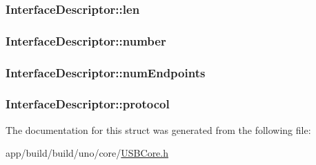 \hypertarget{struct_interface_descriptor_a4a2810138576ef2662bb21dba8e9bbb8}{
\subsubsection[{len}]{ Interface\-Descriptor\-::len}}\label{struct_interface_descriptor_a4a2810138576ef2662bb21dba8e9bbb8}
\hypertarget{struct_interface_descriptor_a5a8c9c810eab8a56dd9d6f961d3795a9}{
\subsubsection[{number}]{ Interface\-Descriptor\-::number}}\label{struct_interface_descriptor_a5a8c9c810eab8a56dd9d6f961d3795a9}
\hypertarget{struct_interface_descriptor_a84292543c62d73f079110c4317df5047}{
\subsubsection[{num\-Endpoints}]{ Interface\-Descriptor\-::num\-Endpoints}}\label{struct_interface_descriptor_a84292543c62d73f079110c4317df5047}
\hypertarget{struct_interface_descriptor_af1883665abc968091c8f874b6b5d7a5f}{
\subsubsection[{protocol}]{ Interface\-Descriptor\-::protocol}}\label{struct_interface_descriptor_af1883665abc968091c8f874b6b5d7a5f}


The documentation for this struct was generated from the following file\-:\begin{DoxyCompactItemize}
\item 
app/build/build/uno/core/\hyperlink{_u_s_b_core_8h}{U\-S\-B\-Core.\-h}\end{DoxyCompactItemize}
